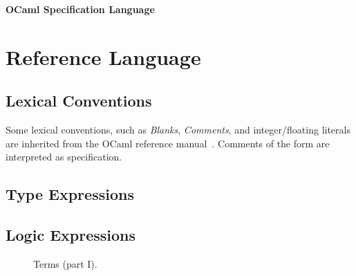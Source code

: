 \documentclass[a4paper,12pt]{book}
\begin{document}
\thispagestyle{empty}
\begin{center}
  \Large\bf
  OCaml Specification Language
\end{center}


\chapter{Reference Language}

\section{Lexical Conventions}

Some lexical conventions, such as \emph{Blanks}, \emph{Comments}, and
integer/floating literals are inherited from the OCaml reference
manual~\cite{OCamlRM}. Comments of the form  are interpreted as
specification.

\begin{center}\end{center}

\begin{center}\end{center}

\begin{center}\end{center}

\begin{center}\end{center}

\section{Type Expressions}

\begin{center}\end{center}

\section{Logic Expressions}

\begin{figure}[p!]
\begin{center}\end{center}
\caption{Terms (part I).}
\label{fig:bnf:term1}
\end{figure}
\end{document}
